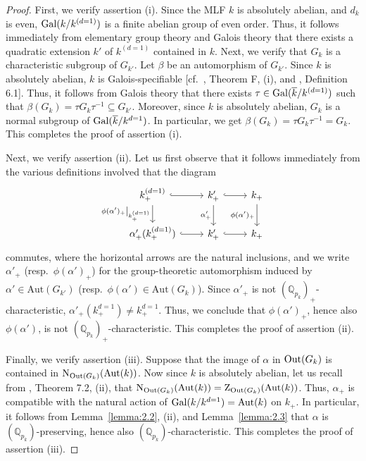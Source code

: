 \documentclass[11pt,showkeys]{article}
\theoremstyle{theorem}
\theoremstyle{definition}
\def\bQ{{\mathbb Q}}
\def\Aut{{\mbox{Aut}}}
\begin{document}
\begin{proof}
First, we verify assertion (i). Since the MLF $k$ is absolutely abelian, and $d_k$ is even, ${\rm Gal}(k/k^{(d=1)})$ is a finite abelian group of even order. Thus, it follows immediately from elementary group theory and Galois theory that there exists a quadratic extension $k'$ of $k^{(d=1)}$ contained in $k$. Next, we verify that $G_k$ is a characteristic subgroup of $G_{k'}$. Let $\beta$ be an automorphism of $G_{k'}$. Since $k$ is absolutely abelian, $k$ is Galois-specifiable [cf.\ \cite{Hoshi2}, Theorem F, (i), and \cite{Hoshi2},  Definition 6.1]. Thus, it follows from Galois theory that there exists $\tau \in {\rm Gal}(\overline{k}/k^{(d=1)})$ such that $\beta(G_k)=\tau G_k \tau^{-1} \subseteq G_{k'}$. Moreover, since $k$ is absolutely abelian, $G_k$ is a normal subgroup of ${\rm Gal}(\overline{k}/k^{d=1})$. In particular, we get $\beta(G_k) = \tau G_k \tau^{-1} = G_k$. This completes the proof of assertion (i).

Next, we verify assertion (ii). Let us first observe that it follows immediately from the various definitions involved that the diagram 
\[
\begin{tikzcd}
k^{(d=1)}_+ \arrow[r, hook] \arrow[d, "\left. \phi(\alpha')_+ \right|_{k^{(d=1)}_+}"'] & k'_+ \arrow[r, hook] \arrow[d, "\alpha'_+"'] & k_+ \arrow[d, "\phi(\alpha')_+"'] \\
\alpha'_+(k^{(d=1)}_+) \arrow[r, hook]                                                 & k'_+ \arrow[r, hook]                               & {k_+}                    
\end{tikzcd}
\]
commutes, where the horizontal arrows are the natural inclusions, and we write $\alpha'_+$ (resp.\ $\phi(\alpha')_+$) for the group-theoretic automorphism induced by $\alpha' \in \Aut(G_{k'})$ (resp.\ $\phi(\alpha') \in \Aut(G_k)$). 
Since $\alpha'_+$ is not $(\bQ_{p_k})_+$-characteristic, $\alpha'_+(k_+^{d=1}) \neq k_+^{d=1}$. 
Thus, we conclude that $\phi(\alpha')_+$, hence also $\phi(\alpha')$, is not $(\bQ_{p_k})_+$-characteristic. This completes the proof of assertion (ii). 

Finally, we verify assertion (iii). 
Suppose that the image of $\alpha$ in ${\rm Out}(G_k)$ is contained in ${\rm N}_{{\rm Out}(G_k)}({\rm Aut}(k))$. Now since $k$ is absolutely abelian, let us recall from \cite{Hoshi2}, Theorem 7.2, (ii), that ${\rm N}_{{\rm Out}(G_k)}({\rm Aut}(k)) = {\rm Z}_{{\rm Out}(G_k)}({\rm Aut}(k))$. Thus, $\alpha_+$ is compatible with the natural action of ${\rm Gal}(k/k^{d=1}) = \Aut(k)$ on $k_{+}$. 
In particular, it follows from Lemma~\ref{lemma:2.2}, (ii), and Lemma~\ref{lemma:2.3} that $\alpha$ is $(\bQ_{p_k})$-preserving, hence also $(\bQ_{p_k})$-characteristic. This completes the proof of assertion (iii).  
\end{proof}
\end{document}
